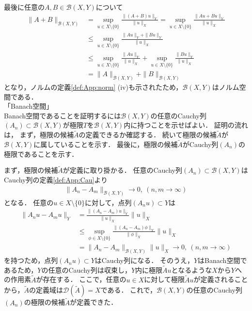 \begin{Proof}
最後に任意の$A, B \in {\mathcal B}(X, Y)$について
\begin{align*}
\|  A + B \|_{{\mathcal B}(X,Y)} &= \sup_{ u \in X \setminus \{ 0 \}} \frac{ \| (A + B) u \|_{Y} }{ \| u \|_{X} } = \sup_{ u \in X \setminus \{ 0 \}} \frac{ \| Au + Bu \|_{Y} }{ \| u \|_{X} } \\
&\le \sup_{ u \in X \setminus \{ 0 \}} \frac{ \| Au \|_{Y} + \| Bu \|_{Y} }{ \| u \|_{X} } \\
&\le \sup_{ u \in X \setminus \{ 0 \}} \frac{ \| Au \|_{Y} }{ \| u \|_{X} } + \sup_{ u \in X \setminus \{ 0 \}} \frac{ \| Bu \|_{Y} }{ \| u \|_{X} } \\
&= \|  A \|_{{\mathcal B}(X,Y)} + \|  B \|_{{\mathcal B}(X,Y)}
\end{align*}
となり，ノルムの定義\ref{def:App:norm} (iv)も示されたため，${\mathcal B}(X, Y)$はノルム空間である．\\

\noindent 「Banach空間」\\
Banach空間であることを証明するには${\mathcal B}(X, Y)$の任意のCauchy列$( A_n ) \subset {\mathcal B}(X, Y)$が極限$T$を${\mathcal B}(X, Y)$内に持つことを示せばよい．
証明の流れは，
まず，極限の候補$\tilde{A}$の定義できるか確認する．
続いて極限の候補$\tilde{A}$が${\mathcal B}(X, Y)$に属していることを示す．
最後に，極限の候補$\tilde{A}$がCauchy列$( A_n )$の極限であることを示す．

まず，極限の候補$\tilde{A}$が定義に取り掛かる．
任意のCauchy列$( A_n ) \subset {\mathcal B}(X, Y)$はCauchy列の定義\ref{def:App:Cau}より
\begin{align*}
\|  A_n  - A_m  \|_{{\mathcal B}(X,Y)} \rightarrow 0, ~ (n, m \rightarrow \infty)
\end{align*}
となる．
任意の$u \in X \setminus\{ 0 \}$に対して，点列$(A_n u) \subset Y$は
\begin{align*}
\|  A_n u  - A_m u \|_{Y} &= \frac{ \|  (A_n  - A_m) u \|_{Y} }{ \| u \|_{X} } \| u \|_{X} \\
&\le \sup_{\phi \in X \setminus \{ 0 \}} \frac{ \|  (A_n  - A_m) \phi \|_{Y} }{ \| \phi \|_{X} } \| u \|_X  \\
&= \| A_n - A_m \|_{{\mathcal B}(X,Y)} \| u \|_{X} \rightarrow 0, ~ (n, m \rightarrow \infty)
\end{align*}
を持つため，点列$(A_n u) \subset Y$はCauchy列になる．
そのうえ，$Y$はBanach空間であるため，$Y$の任意のCauchy列は収束し，$Y$内に極限$\tilde{A} u$となるような$X$から$Y$への作用素$\tilde{A}$が存在する．
ここで，任意の$u \in X$に対して極限$\tilde{A} u$が定義されることから，$\tilde{A}$の定義域は${\mathcal D}(\tilde{A}) = X$である．
これで，${\mathcal B}(X, Y)$の任意のCauchy列$( A_n )$の極限の候補$\tilde{A}$が定義できた．


\end{Proof}
